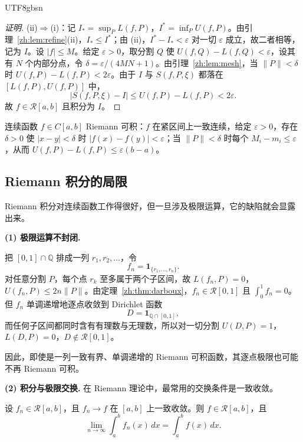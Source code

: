 \documentclass[11pt]{article}
\makeatletter
\newcommand{\envlabel}[1]{\protected@edef\@currentlabel{\themathenv}\label{#1}}
\makeatother
\begin{document}
\begin{CJK*}{UTF8}{gbsn}
\begin{proof}[证明]
(ii)$\Rightarrow$(i)：记 $I_{*}=\sup_{P}L(f,P)$，$I^{*}=\inf_{P}U(f,P)$。由引理~\ref{zh:lem:refine}(ii)，$I_{*}\leq I^{*}$；由 (ii)，$I^{*}-I_{*}<\varepsilon$ 对一切 $\varepsilon$ 成立，故二者相等，记为 $I$。设 $|f|\leq M$。给定 $\varepsilon>0$，取分割 $Q$ 使 $U(f,Q)-L(f,Q)<\varepsilon$，设其有 $N$ 个内部分点，令 $\delta=\varepsilon/(4MN+1)$。由引理~\ref{zh:lem:mesh}，当 $\|P\|<\delta$ 时 $U(f,P)-L(f,P)<2\varepsilon$。由于 $I$ 与 $S(f,P,\xi)$ 都落在 $[L(f,P),U(f,P)]$ 中，
\[
|S(f,P,\xi)-I|\leq U(f,P)-L(f,P)<2\varepsilon.
\]
故 $f\in\mathcal{R}[a,b]$ 且积分为 $I$。
\end{proof}

\begin{example}
连续函数 $f\in C[a,b]$ Riemann 可积：$f$ 在紧区间上一致连续，给定 $\varepsilon>0$，存在 $\delta>0$ 使 $|x-y|<\delta$ 时 $|f(x)-f(y)|<\varepsilon$；当 $\|P\|<\delta$ 时每个 $M_{i}-m_{i}\leq\varepsilon$，从而 $U(f,P)-L(f,P)\leq\varepsilon(b-a)$。
\end{example}

\subsection{Riemann 积分的局限}

Riemann 积分对连续函数工作得很好，但一旦涉及极限运算，它的缺陷就会显露出来。

\textbf{(1) 极限运算不封闭.}

\begin{example}\envlabel{zh:ex:dirichlet}
把 $[0,1]\cap\mathbb{Q}$ 排成一列 $r_{1},r_{2},\ldots$，令
\[
f_{n}=\mathbf{1}_{\{r_{1},\ldots,r_{n}\}}.
\]
对任意分割 $P$，每个点 $r_{k}$ 至多属于两个子区间，故 $L(f_{n},P)=0$，$U(f_{n},P)\leq2n\|P\|$。由定理~\ref{zh:thm:darboux}，$f_{n}\in\mathcal{R}[0,1]$ 且 $\int_{0}^{1}f_{n}=0$。但 $f_{n}$ 单调递增地逐点收敛到 Dirichlet 函数
\[
D=\mathbf{1}_{\mathbb{Q}\cap[0,1]},
\]
而任何子区间都同时含有有理数与无理数，所以对一切分割 $U(D,P)=1$，$L(D,P)=0$，$D\notin\mathcal{R}[0,1]$。

因此，即使是一列一致有界、单调递增的 Riemann 可积函数，其逐点极限也可能不再 Riemann 可积。
\end{example}

\textbf{(2) 积分与极限交换.} 在 Riemann 理论中，最常用的交换条件是一致收敛。

\begin{proposition}\envlabel{zh:prop:unif}
设 $f_{n}\in\mathcal{R}[a,b]$，且 $f_{n}\to f$ 在 $[a,b]$ 上一致收敛。则 $f\in\mathcal{R}[a,b]$，且
\[
\lim_{n\to\infty}\int_{a}^{b}f_{n}(x)\,dx=\int_{a}^{b}f(x)\,dx.
\]
\end{proposition}


\end{CJK*}
\end{document}
